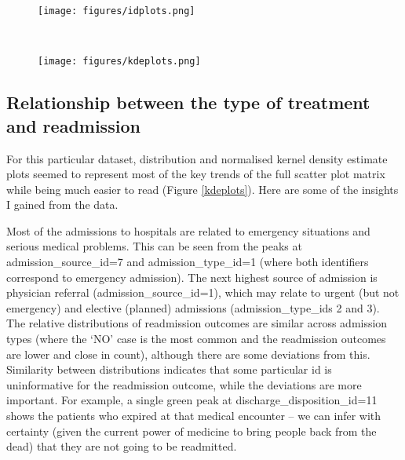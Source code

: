 \documentclass[10pt, twocolumn]{article}
\begin{document}

\begin{figure*}[t!]
	\centering
	\begin{subfigure}[t]{\textwidth}
        \centering
        \texttt{[image: figures/idplots.png]}
	\end{subfigure}
	~
	\begin{subfigure}[t]{\textwidth}
        \centering
		\texttt{[image: figures/kdeplots.png]}
    \end{subfigure}
	\caption{Distributions of admission and discharge identifiers; kernel density estimates for numerical features.}\label{kdeplots}
  \end{figure*}

\subsection{Relationship between the type of treatment and readmission}

For this particular dataset, distribution and normalised kernel density estimate plots seemed to represent most of the key trends of the full scatter plot matrix while being much easier to read (Figure \ref{kdeplots}). Here are some of the insights I gained from the data.

Most of the admissions to hospitals are related to emergency situations and serious medical problems. This can be seen from the peaks at admission\_source\_id=7 and admission\_type\_id=1 (where both identifiers correspond to emergency admission). The next highest source of admission is physician referral (admission\_source\_id=1), which may relate to urgent (but not emergency) and elective (planned) admissions (admission\_type\_ids 2 and 3). The relative distributions of readmission outcomes are similar across admission types (where the `NO' case is the most common and the readmission outcomes are lower and close in count), although there are some deviations from this. Similarity between distributions indicates that some particular id is uninformative for the readmission outcome, while the deviations are more important. For example, a single green peak at discharge\_disposition\_id=11 shows the patients who expired at that medical encounter -- we can infer with certainty (given the current power of medicine to bring people back from the dead) that they are not going to be readmitted.
\end{document}

